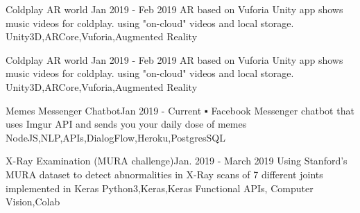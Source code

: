 

\begin{projects}
	
		\project
	{Coldplay AR world }{Jan 2019 - Feb 2019}
	{ 
	}
	{AR based on Vuforia Unity app shows music videos for coldplay. using "on-cloud" videos and local storage.}
	{Unity3D,ARCore,Vuforia,Augmented Reality}
	
	
	\project
	{Coldplay AR world }{Jan 2019 - Feb 2019}
	{ 
	}
	{AR based on Vuforia Unity app shows music videos for coldplay. using "on-cloud" videos and local storage.}
	{Unity3D,ARCore,Vuforia,Augmented Reality}
	
		\project
	{Memes Messenger Chatbot}{Jan 2019 - Current}
	{ }
	{▪	Facebook Messenger chatbot that uses Imgur API and sends you your daily dose of memes }
	{NodeJS,NLP,APIs,DialogFlow,Heroku,PostgresSQL}
	
		\project
	{X-Ray Examination (MURA challenge)}{Jan. 2019 - March 2019}
	{}
	{Using Stanford's MURA dataset to detect abnormalities in X-Ray scans of 7 different joints
implemented in Keras}
	{Python3,Keras,Keras Functional APIs, Computer Vision,Colab}
			

\end{projects}